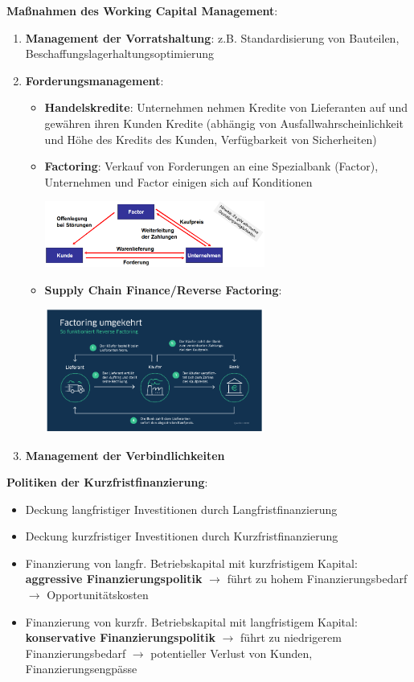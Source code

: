 \textbf{Maßnahmen des Working Capital Management}:
\begin{enumerate}
	\item \textbf{Management der Vorratshaltung}: z.B. Standardisierung von Bauteilen, Beschaffungslagerhaltungsoptimierung
	\item \textbf{Forderungsmanagement}: 
	\begin{itemize}
		\item \textbf{Handelskredite}: Unternehmen nehmen Kredite von Lieferanten auf und gewähren ihren Kunden Kredite (abhängig von Ausfallwahrscheinlichkeit und Höhe des Kredits des Kunden, Verfügbarkeit von Sicherheiten)
		\item \textbf{Factoring}: Verkauf von Forderungen an eine Spezialbank (Factor), Unternehmen und Factor einigen sich auf Konditionen
		\begin{center}
			\includegraphics[width=0.6\textwidth]{images/factoring.png}
		\end{center}
		\pagebreak
		
		\item \textbf{Supply Chain Finance/Reverse Factoring}: 
		\begin{center}
			\includegraphics[width=0.6\textwidth]{images/reverse-factoring.png}
		\end{center}
	\end{itemize}
	\item \textbf{Management der Verbindlichkeiten}
\end{enumerate}
\bigskip
\textbf{Politiken der Kurzfristfinanzierung}:
\begin{itemize}
	\item Deckung langfristiger Investitionen durch Langfristfinanzierung
	\item Deckung kurzfristiger Investitionen durch Kurzfristfinanzierung
	\item Finanzierung von langfr. Betriebskapital mit kurzfristigem Kapital: \textbf{aggressive Finanzierungspolitik} $\rightarrow$ führt zu hohem Finanzierungsbedarf $\rightarrow$ Opportunitätskosten
	\item Finanzierung von kurzfr. Betriebskapital mit langfristigem Kapital: \textbf{konservative Finanzierungspolitik} $\rightarrow$ führt zu niedrigerem Finanzierungsbedarf $\rightarrow$ potentieller Verlust von Kunden, Finanzierungsengpässe
\end{itemize}

